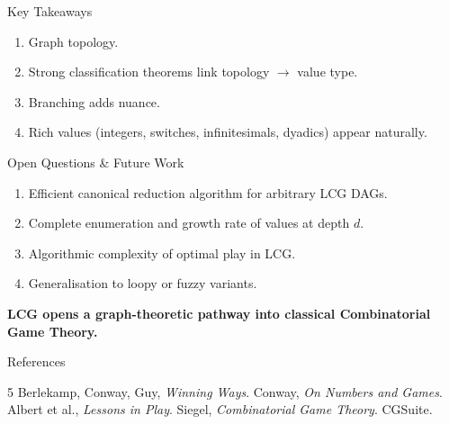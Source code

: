 \documentclass[10pt,aspectratio=169]{beamer}
\begin{document}
\begin{frame}{Key Takeaways}
  \begin{enumerate}
    \item Graph topology.
    \item Strong classification theorems link topology $\to$ value type.
    \item Branching adds nuance. 
    \item Rich values (integers, switches, infinitesimals, dyadics) appear naturally.
  \end{enumerate}
\end{frame}

\begin{frame}{Open Questions \& Future Work}
  \begin{enumerate}
    \item Efficient canonical reduction algorithm for arbitrary LCG DAGs.
    \item Complete enumeration and growth rate of values at depth $d$.
    \item Algorithmic complexity of optimal play in LCG.
    \item Generalisation to loopy or fuzzy variants.
  \end{enumerate}

  \vspace{12pt}
  \centering
  \Large \textbf{LCG opens a graph-theoretic pathway into classical Combinatorial Game Theory.}
\end{frame}

\begin{frame}{References}
  \begin{thebibliography}{5}
     Berlekamp, Conway, Guy, \textit{Winning Ways}.
     Conway, \textit{On Numbers and Games}.
     Albert et al., \textit{Lessons in Play}.
     Siegel, \textit{Combinatorial Game Theory}.
     CGSuite.
  \end{thebibliography}
\end{frame}
\end{document}
